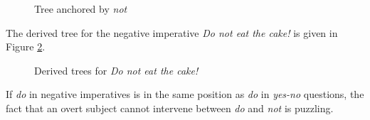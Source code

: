 \begin{figure}[htbp]
  \begin{center} \leavevmode
{} 
  \end{center}
  \caption{Tree anchored by {\it not}}
\label{fig:not}
\end{figure} 

The  derived tree for the negative imperative {\it Do not eat the cake!} is
given in Figure \ref{fig:do-not-leave}.    


\begin{figure}[htbp]
\begin{center} \leavevmode 
{} 
\end{center}
\caption{Derived trees for {\it Do not eat the cake!}}
\label{fig:do-not-leave}
\end{figure} 



If {\it do} in negative imperatives is in the same position as {\it do} in
{\it yes-no} questions, the fact that an overt subject cannot intervene
between {\it do} and {\it not} is puzzling.

